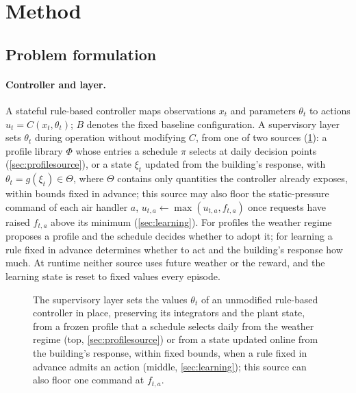 \documentclass{article}
\begin{document}
\section{Method}\label{sec:method}
\subsection{Problem formulation}\label{sec:problem}
\paragraph{Controller and layer.}
A stateful rule-based controller maps observations $x_t$ and parameters $\theta_t$ to actions $u_t = C(x_t, \theta_t)$; $B$
denotes the fixed baseline configuration. A supervisory layer sets $\theta_t$ during operation without
modifying $C$, from one of two sources (\cref{fig:framework}): a profile library $\Phi$ whose entries a schedule $\pi$
selects at daily decision points (\cref{sec:profilesource}), or a state $\xi_t$ updated from the building's
response, with $\theta_t = g(\xi_t) \in \Theta$, where $\Theta$ contains only quantities the controller already exposes, within
bounds fixed in advance; this source may also floor the static-pressure command of each air handler $a$, $u_{t,a} \leftarrow \max(u_{t,a}, f_{t,a})$
once requests have raised $f_{t,a}$ above its minimum (\cref{sec:learning}). For profiles the weather regime proposes a profile and the schedule decides whether to adopt it;
for learning a rule fixed in advance determines whether to act and the building's response how much. At runtime neither
source uses future weather or the reward, and the learning state is reset to fixed values every episode.

\begin{figure}[t]
\centering
\resizebox{\linewidth}{!}{}
\caption{The supervisory layer sets the values $\theta_t$ of an unmodified rule-based controller in place, preserving its
integrators and the plant state, from a frozen profile that a schedule selects daily from the weather regime (top,
\cref{sec:profilesource}) or from a state updated online from the building's response, within fixed bounds, when a
rule fixed in advance admits an action (middle, \cref{sec:learning}); this source can also floor one command at $f_{t,a}$.}
\label{fig:framework}
\end{figure}
\end{document}
